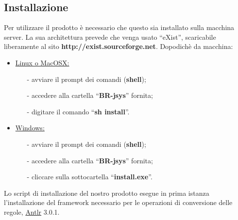 \subsection{Installazione}
Per utilizzare il prodotto \`e necessario che questo sia installato sulla macchina server. La sua architettura prevede che venga usato ``eXist'', scaricabile liberamente al sito \textbf{http://exist.sourceforge.net}. Dopodich\`e da macchina:
\begin{itemize}
\item \underline{Linux o MacOSX:} 
\begin{itemize}
\item[-] avviare il prompt dei comandi (\textbf{shell});
\item[-] accedere alla cartella ``\textbf{BR-jsys}'' fornita; 
\item[-] digitare il comando ``\textbf{sh install}''.
\end{itemize}
\item \underline{Windows:}
\begin{itemize} 
\item[-] avviare il prompt dei comandi (\textbf{shell});
\item[-] accedere alla cartella ``\textbf{BR-jsys}'' fornita;
\item[-] cliccare sulla sottocartella ``\textbf{install.exe}''.
\end{itemize}
\end{itemize}
Lo script di installazione del nostro prodotto esegue in prima istanza l'installazione del framework necessario per le operazioni di conversione delle regole, \underline{Antlr} 3.0.1.
